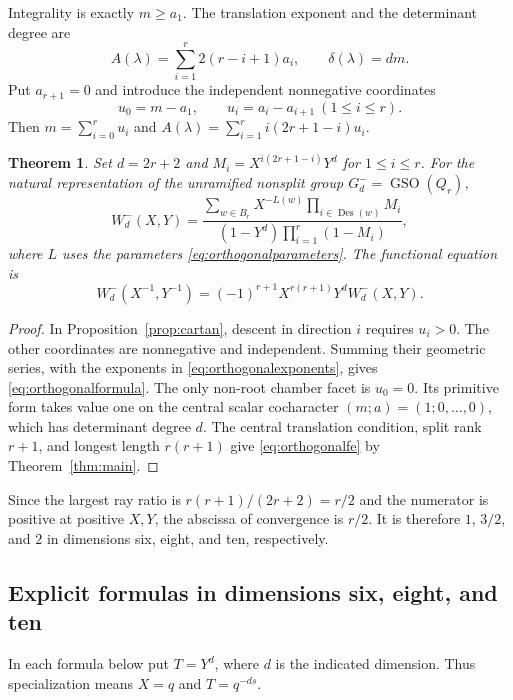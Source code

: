 \documentclass[11pt,a4paper]{article}
\newtheorem{theorem}{Theorem}
\theoremstyle{definition}
\newcommand{\GSO}{\operatorname{GSO}}
\newcommand{\Des}{\operatorname{Des}}
\begin{document}
Integrality is exactly $m\geq a_1$. The translation exponent and
the determinant degree are
\begin{equation}\label{eq:orthogonalexponents}
 A(\lambda)=\sum_{i=1}^r2(r-i+1)a_i,\qquad
 \delta(\lambda)=dm.
\end{equation}
Put $a_{r+1}=0$ and introduce the independent nonnegative coordinates
\[
 u_0=m-a_1,\qquad u_i=a_i-a_{i+1}\ (1\leq i\leq r).
\]
Then $m=\sum_{i=0}^ru_i$ and
$A(\lambda)=\sum_{i=1}^r i(2r+1-i)u_i$.

\begin{theorem}\label{thm:orthogonal}
Set $d=2r+2$ and
$M_i=X^{i(2r+1-i)}Y^d$ for $1\leq i\leq r$.
For the natural representation of the unramified nonsplit group
$G_d^-=\GSO(Q_r)$,
\begin{equation}\label{eq:orthogonalformula}
 W_d^-(X,Y)=
 \frac{\displaystyle\sum_{w\in B_r}X^{-L(w)}
                          \prod_{i\in\Des(w)}M_i}
 {(1-Y^d)\displaystyle\prod_{i=1}^r(1-M_i)},
\end{equation}
where $L$ uses the parameters \eqref{eq:orthogonalparameters}.
The functional equation is
\begin{equation}\label{eq:orthogonalfe}
 W_d^-(X^{-1},Y^{-1})
  =(-1)^{r+1}X^{r(r+1)}Y^dW_d^-(X,Y).
\end{equation}
\end{theorem}
\begin{proof}
In Proposition~\ref{prop:cartan}, descent in direction $i$ requires
$u_i>0$. The other coordinates are nonnegative and independent.
Summing their geometric series, with the exponents in
\eqref{eq:orthogonalexponents}, gives \eqref{eq:orthogonalformula}.
The only non-root chamber facet is $u_0=0$. Its primitive form takes
value one on the central scalar cocharacter $(m;a)=(1;0,\ldots,0)$,
which has determinant degree $d$. The central translation condition,
split rank $r+1$, and longest length $r(r+1)$ give
\eqref{eq:orthogonalfe} by Theorem~\ref{thm:main}.
\end{proof}
Since the largest ray ratio is
$r(r+1)/(2r+2)=r/2$ and the numerator is positive at positive
$X,Y$, the abscissa of convergence is $r/2$. It is therefore
$1$, $3/2$, and $2$ in dimensions six, eight, and ten, respectively.

\subsection{Explicit formulas in dimensions six, eight, and ten}
In each formula below put $T=Y^d$, where $d$ is the indicated
dimension. Thus specialization means $X=q$ and $T=q^{-ds}$.
\end{document}
